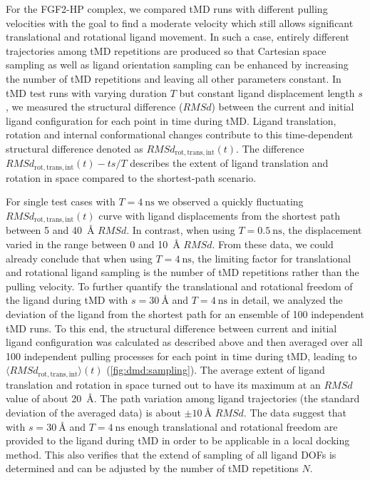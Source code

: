 For the FGF2-HP complex, we compared tMD runs with different pulling velocities
with the goal to find a moderate velocity which still allows significant
translational and rotational ligand movement. In such a case, entirely different
trajectories among tMD repetitions are produced so that Cartesian space sampling
as well as ligand orientation sampling can be enhanced by increasing the number
of tMD repetitions and leaving all other parameters constant. In tMD test runs
with varying duration $T$ but constant ligand displacement length $s$, we
measured the structural difference ($RMSd$) between the current and initial
ligand configuration for each point in time during tMD. Ligand translation,
rotation and internal conformational changes contribute to this time-dependent
structural difference denoted as $RMSd_{\mathrm{rot,trans,int}}(t)$.  The
difference $RMSd_{\mathrm{rot,trans,int}}(t) - ts/T$ describes the extent of
ligand translation and rotation in space compared to the shortest-path scenario.

For single test cases with $T=\SI{4}{\nano\second}$ we observed a quickly
fluctuating $RMSd_{\mathrm{rot,trans,int}}(t)$ curve with ligand displacements
from the shortest path between 5 and \SI{40}{\angstrom} $RMSd$. In contrast,
when using $T=\SI{0.5}{\nano\second}$, the displacement varied in the range
between 0 and \SI{10}{\angstrom} $RMSd$. From these data, we could already
conclude that when using $T=\SI{4}{\nano\second}$, the limiting factor for
translational and rotational ligand sampling is the number of tMD repetitions
rather than the pulling velocity. To further quantify the translational and
rotational freedom of the ligand during tMD with $s=\SI{30}{\angstrom}$ and
$T=\SI{4}{\nano\second}$ in detail, we analyzed the deviation of the ligand from
the shortest path for an ensemble of 100 independent tMD runs. To this end, the
structural difference between current and initial ligand configuration was
calculated as described above and then averaged over all 100 independent pulling
processes for each point in time during tMD, leading to $\langle
RMSd_{\mathrm{rot,trans,int}}\rangle(t)$ (\cref{fig:dmd:sampling}). The average
extent of ligand translation and rotation in space turned out to have its
maximum at an $RMSd$ value of about \SI{20}{\angstrom}. The path variation among
ligand trajectories (the standard deviation of the averaged data) is about
$\pm\SI{10}{\angstrom}$ $RMSd$. The data suggest that with
$s=\SI{30}{\angstrom}$ and $T=\SI{4}{\nano\second}$ enough translational and
rotational freedom are provided to the ligand during tMD in order to be
applicable in a local docking method. This also verifies that the extend of
sampling of all ligand DOFs is determined and can be adjusted by the number of
tMD repetitions $N$.


